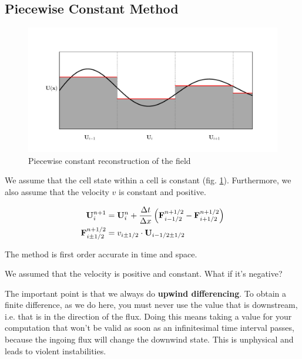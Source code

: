 \subsection{Piecewise Constant Method}

\begin{figure}[htbp]
	\includegraphics[width=\textwidth]{./figures/piecewise_const.pdf}%
	\caption{Piecewise constant reconstruction of the field
		\label{fig:pwconst}
	}
\end{figure}


We assume that the cell state within a cell is constant (fig. \ref{fig:pwconst}).
Furthermore, we also assume that the velocity $v$ is constant and positive.


\begin{align}
	\mathbf{U}_i ^{n+1} &= 
		\mathbf{U}_i^{n} +  \frac{\Delta t}{\Delta x} \left( \mathbf{F}_{i-1/2}^{n+1/2} - \mathbf{F}_{i+1/2}^{n+1/2} \right) \label{eq:advection_basic}\\ 
	\mathbf{F}_{i\pm1/2}^{n+1/2} &= v_{i\pm1/2}\cdot \mathbf{U}_{i - 1/2 \pm 1/2} \label{eq:advection_flux}
\end{align}

The method is first order accurate in time and space.





We assumed that the velocity is positive and constant.
What if it's negative?

The important point is that we always do \textbf{upwind differencing}.
To obtain a finite difference, as we do here, you must never use the value that is downstream, i.e. that is in the direction of the flux.
Doing this means taking a value for your computation that won't be valid as soon as an infinitesimal time interval passes, because the ingoing flux will change the downwind state.
This is unphysical and leads to violent instabilities.

